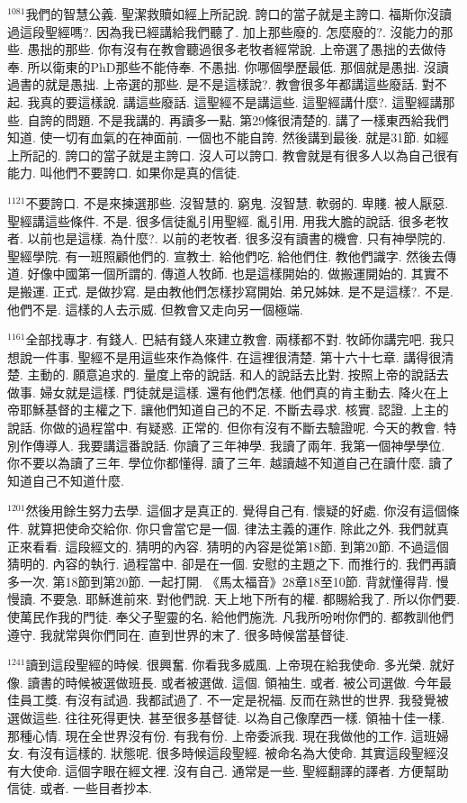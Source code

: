 \documentclass{book}
\begin{document}
$^{1081}$我們的智慧公義.
聖潔救贖如經上所記說.
誇口的當子就是主誇口.
福斯你沒讀過這段聖經嗎?.
因為我已經講給我們聽了.
加上那些廢的.
怎麼廢的?.
沒能力的那些.
愚拙的那些.
你有沒有在教會聽過很多老牧者經常說.
上帝選了愚拙的去做侍奉.
所以衛東的PhD那些不能侍奉.
不愚拙.
你哪個學歷最低.
那個就是愚拙.
沒讀過書的就是愚拙.
上帝選的那些.
是不是這樣說?.
教會很多年都講這些廢話.
對不起.
我真的要這樣說.
講這些廢話.
這聖經不是講這些.
這聖經講什麼?.
這聖經講那些.
自誇的問題.
不是我講的.
再讀多一點.
第29條很清楚的.
講了一樣東西給我們知道.
使一切有血氣的在神面前.
一個也不能自誇.
然後講到最後.
就是31節.
如經上所記的.
誇口的當子就是主誇口.
沒人可以誇口.
教會就是有很多人以為自己很有能力.
叫他們不要誇口.
如果你是真的信徒.

$^{1121}$不要誇口.
不是來揀選那些.
沒智慧的.
窮鬼.
沒智慧.
軟弱的.
卑賤.
被人厭惡.
聖經講這些條件.
不是.
很多信徒亂引用聖經.
亂引用.
用我大膽的說話.
很多老牧者.
以前也是這樣.
為什麼?.
以前的老牧者.
很多沒有讀書的機會.
只有神學院的.
聖經學院.
有一班照顧他們的.
宣教士.
給他們吃.
給他們住.
教他們識字.
然後去傳道.
好像中國第一個所謂的.
傳道人牧師.
也是這樣開始的.
做搬運開始的.
其實不是搬運.
正式.
是做抄寫.
是由教他們怎樣抄寫開始.
弟兄姊妹.
是不是這樣?.
不是.
他們不是.
這樣的人去示威.
但教會又走向另一個極端.

$^{1161}$全部找專才.
有錢人.
巴結有錢人來建立教會.
兩樣都不對.
牧師你講完吧.
我只想說一件事.
聖經不是用這些來作為條件.
在這裡很清楚.
第十六十七章.
講得很清楚.
主動的.
願意追求的.
量度上帝的說話.
和人的說話去比對.
按照上帝的說話去做事.
婦女就是這樣.
門徒就是這樣.
還有他們怎樣.
他們真的肯主動去.
降火在上帝耶穌基督的主權之下.
讓他們知道自己的不足.
不斷去尋求.
核實.
認證.
上主的說話.
你做的過程當中.
有疑惑.
正常的.
但你有沒有不斷去驗證呢.
今天的教會.
特別作傳導人.
我要講這番說話.
你讀了三年神學.
我讀了兩年.
我第一個神學學位.
你不要以為讀了三年.
學位你都懂得.
讀了三年.
越讀越不知道自己在讀什麼.
讀了知道自己不知道什麼.

$^{1201}$然後用餘生努力去學.
這個才是真正的.
覺得自己有.
懷疑的好處.
你沒有這個條件.
就算把使命交給你.
你只會當它是一個.
律法主義的運作.
除此之外.
我們就真正來看看.
這段經文的.
猜明的內容.
猜明的內容是從第18節.
到第20節.
不過這個猜明的.
內容的執行.
過程當中.
卻是在一個.
安慰的主題之下.
而推行的.
我們再讀多一次.
第18節到第20節.
一起打開.
《馬太福音》28章18至10節.
背就懂得背.
慢慢讀.
不要急.
耶穌進前來.
對他們說.
天上地下所有的權.
都賜給我了.
所以你們要.
使萬民作我的門徒.
奉父子聖靈的名.
給他們施洗.
凡我所吩咐你們的.
都教訓他們遵守.
我就常與你們同在.
直到世界的末了.
很多時候當基督徒.

$^{1241}$讀到這段聖經的時候.
很興奮.
你看我多威風.
上帝現在給我使命.
多光榮.
就好像.
讀書的時候被選做班長.
或者被選做.
這個.
領袖生.
或者.
被公司選做.
今年最佳員工獎.
有沒有試過.
我都試過了.
不一定是祝福.
反而在熟世的世界.
我發覺被選做這些.
往往死得更快.
甚至很多基督徒.
以為自己像摩西一樣.
領袖十佳一樣.
那種心情.
現在全世界沒有份.
有我有份.
上帝委派我.
現在我做他的工作.
這班婦女.
有沒有這樣的.
狀態呢.
很多時候這段聖經.
被命名為大使命.
其實這段聖經沒有大使命.
這個字眼在經文裡.
沒有自己.
通常是一些.
聖經翻譯的譯者.
方便幫助信徒.
或者.
一些目者抄本.
\end{document}
